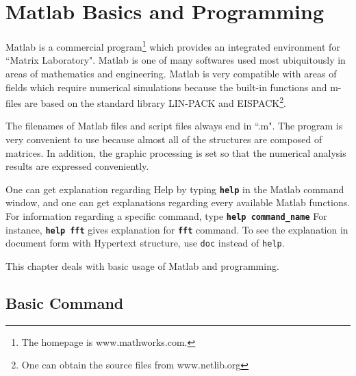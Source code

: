 \chapter{Matlab Basics and Programming }
Matlab is a commercial program\footnote{The homepage is www.mathworks.com.} which provides an integrated environment for ``Matrix Laboratory". Matlab is one of many softwares used most ubiquitously in areas of mathematics and engineering. Matlab is very compatible with areas of fields which require numerical simulations because the built-in functions and m-files are based on the standard library LIN-PACK and EISPACK\footnote{One can obtain the source files from www.netlib.org}.

\vv The filenames of Matlab files and script files always end in ``.m". The program is very convenient to use because almost all of the structures are composed of matrices. In addition, the graphic processing is set so that the numerical analysis results are expressed conveniently.

\vv One can get explanation regarding Help by typing
\matlabp\texttt{\textbf{help}} \vn in the Matlab command window, and one can get explanations regarding every available Matlab functions. For information regarding a specific command, type  \matlabp\texttt{\textbf{help command\_name}} \vn For instance, \matlabp\texttt{\textbf{help fft}} \vn gives explanation for \texttt{\textbf{fft}} command. To see the explanation in document form with Hypertext structure, use {\tt doc} instead of {\tt help}.

\vv This chapter deals with basic usage of Matlab and programming. 

\section{Basic Command}
